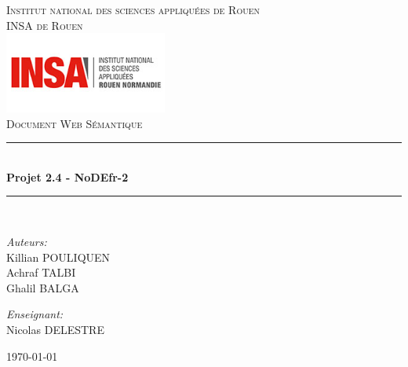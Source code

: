 \documentclass[11pt]{report}
\newcommand{\HRule}{\rule{\linewidth}{0.5mm}}
\begin{document}
\begin{titlepage}

  \begin{center}

    \textsc{{\LARGE Institut national des sciences appliquées de Rouen} \\ \vspace{6
        mm} {\Large INSA de Rouen}} \\
    \vspace{15mm}
    \includegraphics[width=0.4\textwidth]{./INSA.jpg}\\[1.0 cm]

    \textsc{\Large Document Web Sémantique}\\[0.5cm]


    \HRule \\[0.4cm]
           { \huge \bfseries Projet 2.4 - NoDEfr-2}\\[0.4cm]

           \HRule \\[1.5cm]

           \vspace{1.5cm}
           \begin{minipage}{0.4\textwidth}
             \begin{flushleft} \large
               \emph{Auteurs:}\\
               Killian \textsc{POULIQUEN}
               \\
               Achraf \textsc{TALBI}
               \\
               Ghalil \textsc{BALGA}
             \end{flushleft}
           \end{minipage}
           \begin{minipage}{0.4\textwidth}
             \begin{flushright} \large
               \emph{Enseignant:} \\
               Nicolas \textsc{DELESTRE} 
             \end{flushright}
           \end{minipage}

           \vfill
               {\large \today}
  \end{center}

\end{titlepage} 
\tableofcontents
\end{document}
